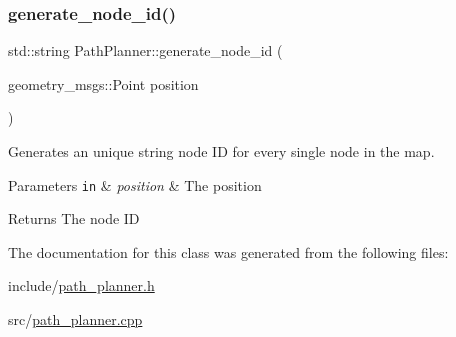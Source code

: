 \subsubsection{\texorpdfstring{generate\+\_\+node\+\_\+id()}{generate\_node\_id()}}
{\footnotesize\ttfamily std\+::string Path\+Planner\+::generate\+\_\+node\+\_\+id (\begin{DoxyParamCaption}\item[{geometry\+\_\+msgs\+::\+Point}]{position }\end{DoxyParamCaption})}



Generates an unique string node ID for every single node in the map. 


\begin{DoxyParams}[1]{Parameters}
\mbox{\tt in}  & {\em position} & The position\\
\hline
\end{DoxyParams}
\begin{DoxyReturn}{Returns}
The node ID 
\end{DoxyReturn}


The documentation for this class was generated from the following files\+:\begin{DoxyCompactItemize}
\item 
include/\hyperlink{path__planner_8h}{path\+\_\+planner.\+h}\item 
src/\hyperlink{path__planner_8cpp}{path\+\_\+planner.\+cpp}\end{DoxyCompactItemize}
